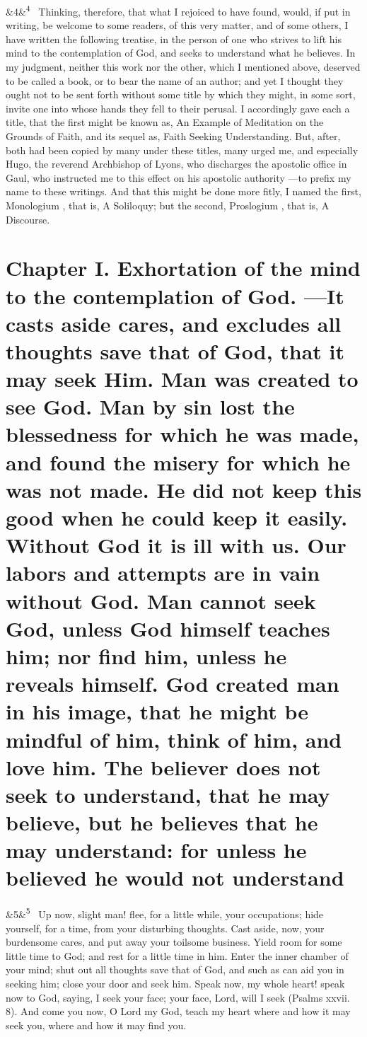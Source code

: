 \documentclass[12pt]{article}
\newcommand{\para}[1][]{\par\noindent\ifx&#1&\else\textsuperscript{\footnotesize #1}~\fi}
\begin{document}
\para[4] Thinking, therefore, that what I rejoiced to have found, would, if put in writing, be welcome to some readers, of this very matter, and of some others, I have written the following treatise, in the person of one who strives to lift his mind to the contemplation of God, and seeks to understand what he believes. In my judgment, neither this work nor the other, which I mentioned above, deserved to be called a book, or to bear the name of an author; and yet I thought they ought not to be sent forth without some title by which they might, in some sort, invite one into whose hands they fell to their perusal. I accordingly gave each a title, that the first might be known as, An Example of Meditation on the Grounds of Faith, and its sequel as, Faith Seeking Understanding. But, after, both had been copied by many under these titles, many urged me, and especially Hugo, the reverend Archbishop of Lyons, who discharges the apostolic office in Gaul, who instructed me to this effect on his apostolic authority ---to prefix my name to these writings. And that this might be done more fitly, I named the first, Monologium , that is, A Soliloquy; but the second, Proslogium , that is, A Discourse.


\section*{Chapter I. Exhortation of the mind to the contemplation of God. ---It casts aside cares, and excludes all thoughts save that of God, that it may seek Him. Man was created to see God. Man by sin lost the blessedness for which he was made, and found the misery for which he was not made. He did not keep this good when he could keep it easily. Without God it is ill with us. Our labors and attempts are in vain without God. Man cannot seek God, unless God himself teaches him; nor find him, unless he reveals himself. God created man in his image, that he might be mindful of him, think of him, and love him. The believer does not seek to understand, that he may believe, but he believes that he may understand: for unless he believed he would not understand}

\para[5] Up now, slight man! flee, for a little while, your occupations; hide yourself, for a time, from your disturbing thoughts. Cast aside, now, your burdensome cares, and put away your toilsome business. Yield room for some little time to God; and rest for a little time in him. Enter the inner chamber of your mind; shut out all thoughts save that of God, and such as can aid you in seeking him; close your door and seek him. Speak now, my whole heart! speak now to God, saying, I seek your face; your face, Lord, will I seek (Psalms xxvii. 8). And come you now, O Lord my God, teach my heart where and how it may seek you, where and how it may find you.
\end{document}
